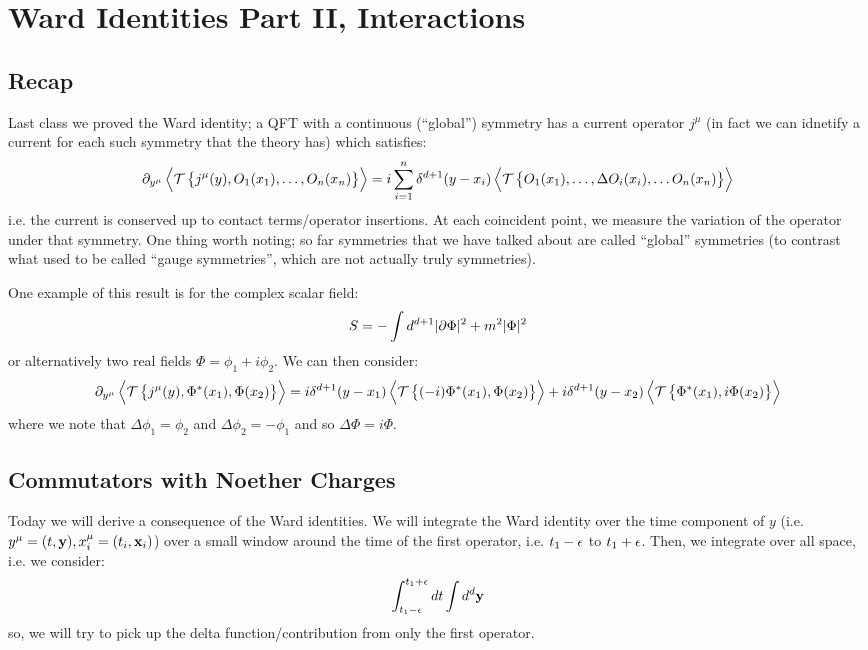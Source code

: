 \section{Ward Identities Part II, Interactions}
\subsection{Recap}
Last class we proved the Ward identity; a QFT with a continuous (``global'') symmetry has a current operator $j^\mu$ (in fact we can idnetify a current for each such symmetry that the theory has) which satisfies:
\begin{equation}
    \partial_{y^\mu}\left< \mathcal{T}\set{j^\mu(y), O_1(x_1), \ldots, O_n(x_n)} \right> = i\sum_{i=1}^n\delta^{d+1}(y - x_i)\left< \mathcal{T}\set{O_1(x_1), \ldots, \Delta O_i(x_i), \ldots O_n(x_n)} \right>
\end{equation}
i.e. the current is conserved up to contact terms/operator insertions. At each coincident point, we measure the variation of the operator under that symmetry. One thing worth noting; so far symmetries that we have talked about are called ``global'' symmetries (to contrast what used to be called ``gauge symmetries'', which are not actually truly symmetries).

One example of this result is for the complex scalar field:
\begin{equation}
    S = -\int d^{d+1} \lvert \partial\Phi \rvert^2 + m^2\lvert \Phi \rvert^2
\end{equation}
or alternatively two real fields $\Phi = \phi_1 + i\phi_2$. We can then consider:
\begin{equation}
    \partial_{y^\mu}\left< \mathcal{T}\set{j^\mu(y), \Phi^*(x_1), \Phi(x_2)} \right> = i\delta^{d+1}(y - x_1)\left< \mathcal{T}\set{(-i)\Phi^*(x_1), \Phi(x_2)} \right> + i\delta^{d+1}(y - x_2)\left< \mathcal{T}\set{\Phi^*(x_1), i\Phi(x_2)} \right>
\end{equation}
where we note that $\Delta \phi_1 = \phi_2$ and $\Delta \phi_2 = -\phi_1$ and so $\Delta \Phi = i\Phi$. 

\subsection{Commutators with Noether Charges}
Today we will derive a consequence of the Ward identities. We will integrate the Ward identity over the time component of $y$ (i.e. $y^\mu = (t, \mathbf{y}), x^\mu_i = (t_i, \mathbf{x}_i)$) over a small window around the time of the first operator, i.e. $t_1 - \epsilon$ to $t_1 + \epsilon$. Then, we integrate over all space, i.e. we consider:
\begin{equation}
    \int_{t_1-\epsilon}^{t_1+\epsilon}dt \int d^d\mathbf{y}
\end{equation}
so, we will try to pick up the delta function/contribution from only the first operator.


